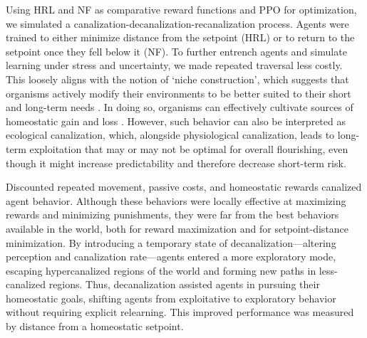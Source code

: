 \documentclass[12pt,fleqn]{article}
\begin{document}
Using HRL and NF as comparative reward functions and PPO for optimization, we simulated a canalization-decanalization-recanalization process. Agents were trained to either minimize distance from the setpoint (HRL) or to return to the setpoint once they fell below it (NF). To further entrench agents and simulate learning under stress and uncertainty, we made repeated traversal less costly. This loosely aligns with the notion of ‘niche construction’, which suggests that organisms actively modify their environments to be better suited to their short and long-term needs \cite{pio-lopez_scale-free_2025}. In doing so, organisms can effectively cultivate sources of homeostatic gain and loss \cite{lyon_reframing_2021}. However, such behavior can also be interpreted as ecological canalization, which, alongside physiological canalization, leads to long-term exploitation that may or may not be optimal for overall flourishing, even though it might increase predictability and therefore decrease short-term risk.

Discounted repeated movement, passive costs, and homeostatic rewards canalized agent behavior. Although these behaviors were locally effective at maximizing rewards and minimizing punishments, they were far from the best behaviors available in the world, both for reward maximization and for setpoint-distance minimization. By introducing a temporary state of decanalization---altering perception and canalization rate---agents entered a more exploratory mode, escaping hypercanalized regions of the world and forming new paths in less-canalized regions. Thus, decanalization assisted agents in pursuing their homeostatic goals, shifting agents from exploitative to exploratory behavior without requiring explicit relearning. This improved performance was measured by distance from a homeostatic setpoint.
\end{document}
